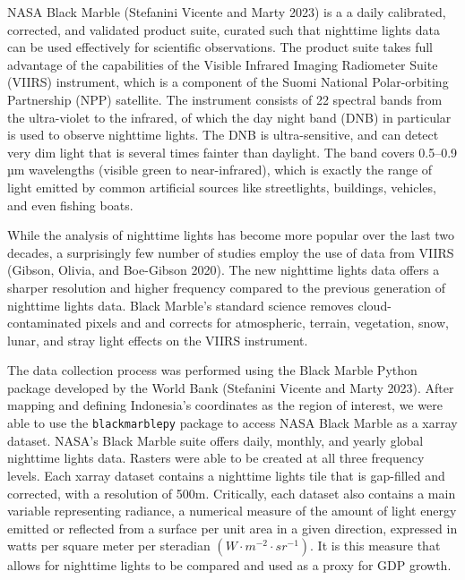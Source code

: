 \documentclass[
]{interact}
\begin{document}
NASA Black Marble (Stefanini Vicente and Marty 2023) is a a daily
calibrated, corrected, and validated product suite, curated such that
nighttime lights data can be used effectively for scientific
observations. The product suite takes full advantage of the capabilities
of the Visible Infrared Imaging Radiometer Suite (VIIRS) instrument,
which is a component of the Suomi National Polar-orbiting Partnership
(NPP) satellite. The instrument consists of 22 spectral bands from the
ultra-violet to the infrared, of which the day night band (DNB) in
particular is used to observe nighttime lights. The DNB is
ultra-sensitive, and can detect very dim light that is several times
fainter than daylight. The band covers 0.5--0.9 µm wavelengths (visible
green to near-infrared), which is exactly the range of light emitted by
common artificial sources like streetlights, buildings, vehicles, and
even fishing boats.

While the analysis of nighttime lights has become more popular over the
last two decades, a surprisingly few number of studies employ the use of
data from VIIRS (Gibson, Olivia, and Boe-Gibson 2020). The new nighttime
lights data offers a sharper resolution and higher frequency compared to
the previous generation of nighttime lights data. Black Marble's
standard science removes cloud-contaminated pixels and and corrects for
atmospheric, terrain, vegetation, snow, lunar, and stray light effects
on the VIIRS instrument.

The data collection process was performed using the Black Marble Python
package developed by the World Bank (Stefanini Vicente and Marty 2023).
After mapping and defining Indonesia's coordinates as the region of
interest, we were able to use the \texttt{blackmarblepy} package to
access NASA Black Marble as a xarray dataset. NASA's Black Marble suite
offers daily, monthly, and yearly global nighttime lights data. Rasters
were able to be created at all three frequency levels. Each xarray
dataset contains a nighttime lights tile that is gap-filled and
corrected, with a resolution of 500m. Critically, each dataset also
contains a main variable representing radiance, a numerical measure of
the amount of light energy emitted or reflected from a surface per unit
area in a given direction, expressed in watts per square meter per
steradian \((W \cdot m^{-2} \cdot sr^{-1})\). It is this measure that
allows for nighttime lights to be compared and used as a proxy for GDP
growth.
\end{document}

